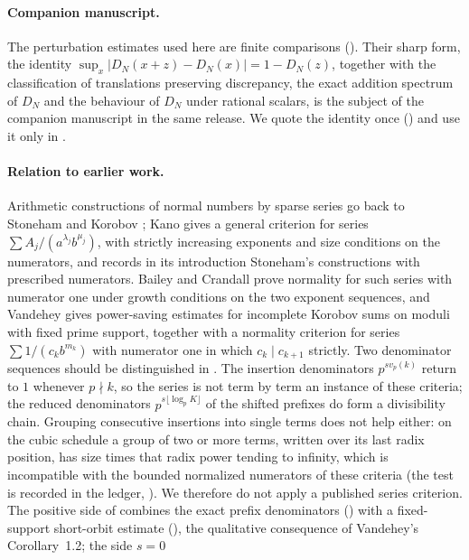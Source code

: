 \documentclass[11pt]{article}
\begin{document}
\paragraph{Companion manuscript.} The perturbation estimates used here are finite comparisons
(). Their sharp form, the identity $\sup_x|D_N(x+z)-D_N(x)|=1-D_N(z)$, together with
the classification of translations preserving discrepancy, the exact addition spectrum of $D_N$ and
the behaviour of $D_N$ under rational scalars, is the subject of the companion manuscript
\cite{CompanionH} in the same release. We quote the identity once () and use it
only in .

\paragraph{Relation to earlier work.} Arithmetic constructions of normal numbers by sparse series
go back to Stoneham \cite{Stoneham73} and Korobov \cite{Korobov72}; Kano \cite[Theorem~1]{Kano93} gives
a general criterion for series $\sum A_j/(a^{\lambda_j}b^{\mu_j})$, with strictly increasing exponents
and size conditions on the numerators, and records in its introduction Stoneham's constructions with
prescribed numerators. Bailey and Crandall \cite[Theorem~4.8]{BC02} prove normality for such series
with numerator one under growth conditions on the two exponent sequences, and Vandehey
\cite[Corollary~1.2 and Theorem~7.4]{Vandehey19} gives power-saving estimates for incomplete Korobov
sums on moduli with fixed prime support, together with a normality criterion for series
$\sum 1/(c_kb^{m_k})$ with numerator one in which $c_k\mid c_{k+1}$ strictly. Two denominator sequences
should be distinguished in . The insertion denominators $p^{sv_p(k)}$ return to $1$ whenever
$p\nmid k$, so the series is not term by term an instance of these criteria; the reduced denominators
$p^{s\lfloor\log_pK\rfloor}$ of the shifted prefixes do form a divisibility chain. Grouping consecutive
insertions into single terms does not help either: on the cubic schedule a group of two or more terms,
written over its last radix position, has size times that radix power tending to infinity, which is
incompatible with the bounded normalized numerators of these criteria (the test is recorded in the
ledger, ). We therefore do not apply a published series criterion. The positive side
of  combines the exact prefix denominators () with a fixed-support short-orbit
estimate (), the qualitative consequence of Vandehey's Corollary~1.2; the side $s=0$
\end{document}
